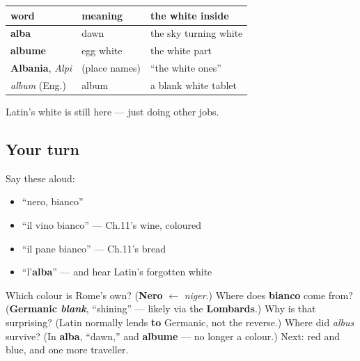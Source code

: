 \begin{cousinweb}
\noindent
\begin{tabularx}{\linewidth}{@{}>{\raggedright\arraybackslash}X>{\raggedright\arraybackslash}X>{\raggedright\arraybackslash}X@{}}
\toprule
\textbf{word} & \textbf{meaning} & \textbf{the white inside} \\
\midrule
\textbf{alba} & dawn & the sky turning white \\
\textbf{albume} & egg white & the white part \\
\textbf{Albania}, \emph{Alpi} & (place names) & \textquotedblleft{}the white ones\textquotedblright{} \\
\emph{album} (Eng.) & album & a blank white tablet \\
\bottomrule
\end{tabularx}

Latin's white is still here — just doing other jobs.
\end{cousinweb}

\subsection*{Your turn}
Say these aloud:

\begin{itemize}
\raggedright
  \item \textquotedblleft{}nero, bianco\textquotedblright{}
  \item \textquotedblleft{}il vino bianco\textquotedblright{} — Ch.11's wine, coloured
  \item \textquotedblleft{}il pane bianco\textquotedblright{} — Ch.11's bread
  \item \textquotedblleft{}l'\textbf{alba}\textquotedblright{} — and hear Latin's forgotten white
\end{itemize}

\begin{tcolorbox}[breakable,colback=teal!4,colframe=teal!35!black,title={Before you move on}]
Which colour is Rome's own? (\textbf{Nero} $\leftarrow$ \emph{niger}.) Where does \textbf{bianco} come from? (\textbf{Germanic \emph{blank}}, \textquotedblleft{}shining\textquotedblright{} — likely via the \textbf{Lombards}.) Why is that surprising? (Latin normally lends \textbf{to} Germanic, not the reverse.) Where did \emph{albus} survive? (In \textbf{alba}, \textquotedblleft{}dawn,\textquotedblright{} and \textbf{albume} — no longer a colour.) Next: red and blue, and one more traveller.
\end{tcolorbox}
